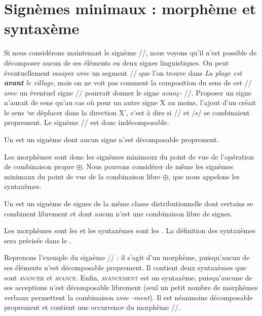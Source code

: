 \section{Signèmes minimaux : morphème et syntaxème}\label{sec:2.2.11}

Si nous considérons maintenant le signème //, nous voyons qu’il n’est possible de décomposer aucun de ses éléments en deux signes linguistiques. On peut éventuellement essayer avec un segment // que l’on trouve dans \textit{La plage est} \textbf{\textit{avant}} \textit{le village}, mais on ne voit pas comment la composition du sens de cet // avec un éventuel signe // pourrait donner le signe \textit{avanç-} //. Proposer un signe  n’aurait de sens qu’au cas où pour un autre signe X au moins, l’ajout d’un  créait le sens ‘se déplacer dans la direction X’, c’est à dire si // et /s/ se combinaient proprement. Le signème // est donc indécomposable.

{Un  est un signème dont aucun signe n’est décomposable proprement.}

Les morphèmes sont donc les signèmes minimaux du point de vue de l’opération de combinaison propre ${\boxplus}$. Nous pouvons considérer de même les signèmes minimaux du point de vue de la combinaison libre ${\oplus}$, que nous appelons les syntaxèmes.

{Un  est un signème de signes de la même classe distributionnelle dont certains se combinent librement et dont aucun n’est une combinaison libre de signes.}

Les morphèmes sont les  et les syntaxèmes sont les . La définition des syntaxèmes sera précisée dans le .

Reprenons l’exemple du signème // : il s’agit d’un morphème, puisqu’aucun de ses éléments n’est décomposable proprement. Il contient deux syntaxèmes que sont \textsc{avancer} et \textsc{avance}. Enfin, \textsc{avancement} est un syntaxème, puisqu’aucune de ses acceptions n’est décomposable librement (seul un petit nombre de morphèmes verbaux permettent la combinaison avec \textit{{}-ment}). Il est néanmoins décomposable proprement et contient une occurrence du morphème //.

